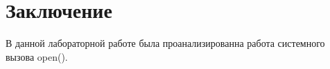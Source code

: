 \chapter{Заключение}

В данной лабораторной работе была проанализированна работа системного вызова open().
